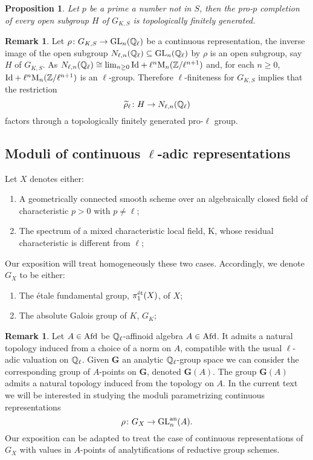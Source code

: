\documentclass[10pt,a4paper]{amsart}
\numberwithin{equation}{subsection}
\theoremstyle{plain}
\newtheorem{prop}[theorem]{Proposition}
\theoremstyle{definition}
\newtheorem{rema}[theorem]{Remark}
\theoremstyle{remark}
\numberwithin{equation}{section}
\begin{document}
\begin{prop}
Let $p $ be a prime a number not in $S$, then the pro-$p$ completion of every open subgroup $H $ of $G_{K, S}$ is topologically finitely generated.
\end{prop}

\begin{rema}
Let $\rho \colon G_{K, S} \to \mathrm{GL}_n(\mathbb{Q}_\ell)$ be a continuous representation, the inverse image of the open subgroup $N_{\ell, n } ( \mathbb{Q}_\ell) \subseteq \mathrm{GL}_n(\mathbb{Q}_\ell)$ by $\rho$ is an open subgroup, say $H$ of $G_{K, S}$. As $N_{\ell, n } ( \mathbb{Q}_\ell) \cong \lim_{n \geq 0}
\mathrm{Id} + \ell^n \mathrm{M}_n( \mathbb Z/ \ell^{n + 1})$ and, for each $n \geq 0 $, $\mathrm{Id} + \ell^n \mathrm{M}_n( \mathbb Z/ \ell^{n + 1})$ is an $\ell$-group. Therefore $\ell$-finiteness for $G_{K, S}$ implies that the restriction
	\[
		\widetilde{\rho }_\ell \colon H \to N_{ \ell, n }(\mathbb{Q}_\ell)
	\]
factors through a topologically finitely generated pro-$\ell$ group.
\end{rema}

\subsection{Moduli of continuous $\ell$-adic representations} \label{section 2.3}
Let $X$ denotes either:
\begin{enumerate}
\item A geometrically connected smooth scheme over an algebraically closed field of characteristic $p>0$ with $p \neq \ell$;
\item The spectrum of a mixed characteristic local field, K, whose residual characteristic is different from $\ell$;
\end{enumerate}

Our exposition will treat homogeneously these two cases. Accordingly, we denote $G_X$ to be either:

\begin{enumerate}
\item The \'etale fundamental group, $\pi_1^{\text{\'et}}(X)$, of $X$;
\item The absolute Galois group of $K$, $G_K$;
\end{enumerate}

\begin{rema}
Let $A \in \mathrm{Afd}$ be $\mathbb{Q}_{\ell}$-affinoid algebra $A \in \mathrm{Afd}$. It admits a natural topology induced from a choice of a norm on $A$, compatible with the usual $\ell$-adic valuation on $\mathbb{Q}_\ell$. 
Given $\mathbf G$
an analytic $\mathbb{Q}_\ell$-group space we can consider the corresponding group of $A$-points on $\mathbf G$, denoted $\mathbf G(A)$. The group $\mathbf G (A)$ admits a natural topology induced from the topology on $A$.
In the current text we will be interested in studying the moduli parametrizing continuous representations
	\[
		\rho \colon G_X \to \mathbf{ \mathrm{GL}}^{\mathrm{an}}_n(A).
	\]
Our exposition can be adapted to treat the case of continuous representations of $G_X$ with values in $A$-points of analytifications of reductive group schemes.
\end{rema}
\end{document}
